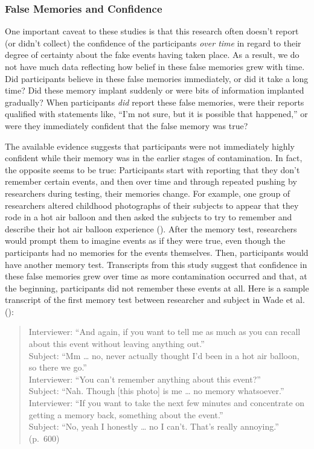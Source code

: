 \documentclass[
]{krantz}
\begin{document}
\subsubsection*{False Memories and Confidence}\label{false-memories-and-confidence}


One important caveat to these studies is that this research often doesn't report (or didn't collect) the confidence of the participants \emph{over time} in regard to their degree of certainty about the fake events having taken place. As a result, we do not have much data reflecting how belief in these false memories grew with time. Did participants believe in these false memories immediately, or did it take a long time? Did these memory implant suddenly or were bits of information implanted gradually? When participants \emph{did} report these false memories, were their reports qualified with statements like, ``I'm not sure, but it is possible that happened,'' or were they immediately confident that the false memory was true?

The available evidence suggests that participants were not immediately highly confident while their memory was in the earlier stages of contamination. In fact, the opposite seems to be true: Participants start with reporting that they don't remember certain events, and then over time and through repeated pushing by researchers during testing, their memories change. For example, one group of researchers altered childhood photographs of their subjects to appear that they rode in a hot air balloon and then asked the subjects to try to remember and describe their hot air balloon experience (). After the memory test, researchers would prompt them to imagine events as if they were true, even though the participants had no memories for the events themselves. Then, participants would have another memory test. Transcripts from this study suggest that confidence in these false memories grew over time as more contamination occurred and that, at the beginning, participants did not remember these events at all. Here is a sample transcript of the first memory test between researcher and subject in Wade et al. ():

\begin{quote}
Interviewer: ``And again, if you want to tell me as much as you can recall about this event without leaving anything out.''\\
Subject: ``Mm \ldots{} no, never actually thought I'd been in a hot air balloon, so there we go.''\\
Interviewer: ``You can't remember anything about this event?''\\
Subject: ``Nah. Though {[}this photo{]} is me \ldots{} no memory whatsoever.''\\
Interviewer: ``If you want to take the next few minutes and concentrate on getting a memory back, something about the event.''\\
Subject: ``No, yeah I honestly \ldots{} no I can't. That's really annoying.'' (p.~600)
\end{quote}
\end{document}
